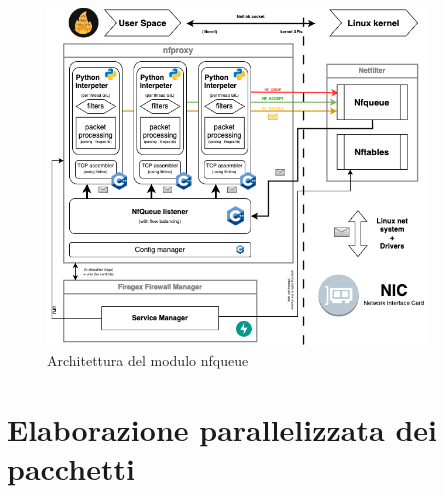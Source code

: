 \begin{figure}[H]
    \centering
    \includegraphics[width=0.9\textwidth]{images/chapter3/nfproxy.drawio.png}
    \caption{Architettura del modulo nfqueue}\label{fig:firegex_nfproxy_arch}
\end{figure}

\section{Elaborazione parallelizzata dei pacchetti}

